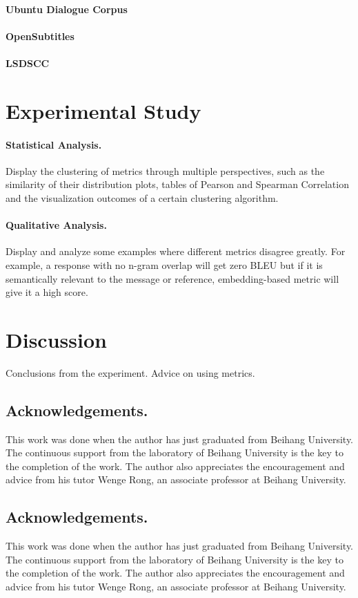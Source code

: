 \documentclass[runningheads]{llncs}
\begin{document}
    \paragraph{Ubuntu Dialogue Corpus}
    \paragraph{OpenSubtitles}
    \paragraph{LSDSCC}


    \section{Experimental Study}
    \paragraph{Statistical Analysis.}
    Display the clustering of metrics through multiple perspectives,
    such as the similarity of their distribution plots, tables of Pearson and Spearman Correlation
    and the visualization outcomes of a certain clustering algorithm.

    \paragraph{Qualitative Analysis.}
    Display and analyze some examples where different metrics disagree greatly.
    For example, a response with no n-gram overlap will get zero BLEU but if it is semantically
    relevant to the message or reference, embedding-based metric will give it a high score.
    \section{Discussion}
    Conclusions from the experiment.
    Advice on using metrics.
    \subsection*{Acknowledgements.}
    This work was done when the author has just graduated from Beihang University. The continuous support from the laboratory of Beihang University is the key to the completion of the work. The author also appreciates the encouragement and advice from his tutor Wenge Rong, an associate professor at Beihang University.
    \subsection*{Acknowledgements.}
    This work was done when the author has just graduated from Beihang University. The continuous support from the laboratory of Beihang University is the key to the completion of the work. The author also appreciates the encouragement and advice from his tutor Wenge Rong, an associate professor at Beihang University.

    
    
\end{document}
